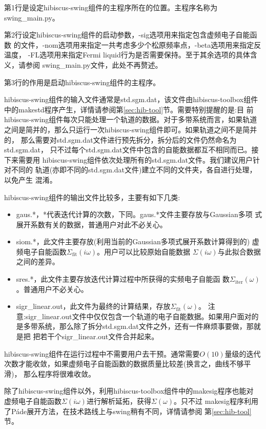 第1行是设定hibiscus-swing组件的主程序所在的位置。主程序名称为swing\_main.py。

第2行设定hibiscus-swing组件的启动参数，-sig选项用来指定包含虚频电子自能函数
的文件，-nom选项用来指定一共考虑多少个松原频率点，-beta选项用来指定反温度，
-FL选项用来指定Fermi liquid行为是否需要保持。至于其余选项的具体含义，请参阅
swing\_main.py文件，此处不再赘述。

第3行的作用是启动hibiscus-swing组件的主程序。

hibiscus-swing组件的输入文件通常是std.sgm.dat，该文件由hibiscus-toolbox组件
中的makestd程序产生，详情请参阅第\ref{sec:hib-tool}节。需要特别提醒的是:目
前hibiscus-swing组件每次只能处理一个轨道的数据。对于多带系统而言，如果轨道
之间是简并的，那么只运行一次hibiscus-swing组件即可。如果轨道之间不是简并的，
那么需要对std.sgm.dat文件进行预先拆分，拆分后的文件仍然命名为std.sgm.dat，
只不过每个std.sgm.dat文件中包含的自能数据都互不相同而已。接下来需要用
hibiscus-swing组件依次处理所有的std.sgm.dat文件。我们建议用户针对不同的
轨道(亦即不同的std.sgm.dat文件)建立不同的文件夹，各自进行处理，以免产生
混淆。

hibiscus-swing组件的输出文件比较多，主要有如下几类:

\begin{itemize}
\item gaus.*，*代表迭代计算的次数，下同。gaus.*文件主要存放与Gaussian多项
式展开系数有关的数据，普通用户对此不必关心。
\item siom.*，此文件主要存放(利用当前的Gaussian多项式展开系数计算得到的)
虚频电子自能函数$\Sigma_{\text{fit}}(i\omega)$。用户可以比较原始自能数据
$\Sigma(i\omega)$与此拟合数据之间的差异。
\item sres.*，此文件主要存放迭代计算过程中所获得的实频电子自能函
数$\Sigma_{\text{iter}}(\omega)$。普通用户不必关心。
\item sigr\_linear.out，此文件为最终的计算结果，存放$\Sigma_{\text{fit}}(\omega)$。
注意:sigr\_linear.out文件中仅仅包含一个轨道的电子自能数据。如果用户面对的
是多带系统，那么除了拆分std.sgm.dat文件之外，还有一件麻烦事要做，那就是把
把若干个sigr\_linear.out文件合并起来。
\end{itemize}

hibiscus-swing组件在运行过程中不需要用户去干预。通常需要$O(10)$量级的迭代
次数才能收敛，如果虚频电子自能函数的数据质量比较差(换言之，曲线不够平滑)，
那么程序将很难收敛。

除了hibiscus-swing组件以外，利用hibiscus-toolbox组件中的makesig程序也能对
虚频电子自能函数$\Sigma(i\omega)$进行解析延拓，获得$\Sigma(\omega)$。只不过
makesig程序利用了P\'{a}de展开方法，在技术路线上与swing稍有不同，详情请参阅
第\ref{sec:hib-tool}节。

